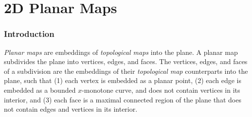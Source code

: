 


\chapter{2D Planar Maps}
\label{chap:planar_map_2_ref}
\subsection*{Introduction}

{\em Planar maps} are embeddings of {\em topological maps} into the
plane. A planar map subdivides the plane into vertices, edges, and
faces. The vertices, edges, and faces of a subdivision are the
embeddings of their {\em topological map} counterparts into the plane,
such that (1) each vertex is embedded as a planar point, (2) each edge
is embedded as a bounded $x$-monotone curve, and does not contain
vertices in its interior, and (3) each face is a maximal connected
region of the plane that does not contain edges and vertices in its
interior.

